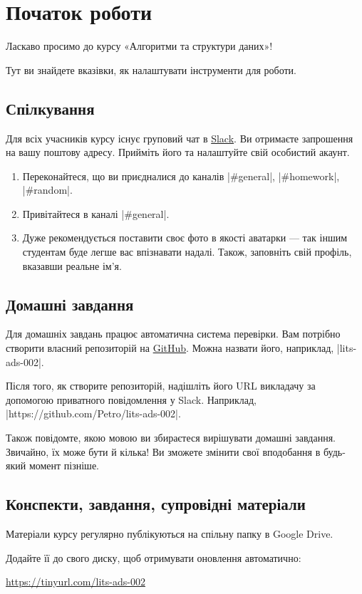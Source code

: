 \documentclass[12pt,a4paper]{article}
\begin{document}
\section*{Початок роботи}

Ласкаво просимо до курсу «Алгоритми та структури даних»!

Тут ви знайдете вказівки, як налаштувати інструменти для роботи.


\subsection*{Спілкування}

Для всіх учасників курсу існує груповий чат в \href{https://slack.com}{\color{blue}Slack}.
Ви отримаєте запрошення на вашу поштову адресу.
Прийміть його та налаштуйте свій особистий акаунт.

\begin{enumerate}
    \item Переконайтеся, що ви приєдналися до каналів |#general|, |#homework|, |#random|.
    \item Привітайтеся в каналі |#general|.
    \item Дуже рекомендується поставити своє фото в якості аватарки --- так іншим студентам буде легше вас впізнавати надалі. Також, заповніть свій профіль, вказавши реальне ім’я.
\end{enumerate}


\subsection*{Домашні завдання}

Для домашніх завдань працює автоматична система перевірки.
Вам потрібно створити власний репозиторій на \href{https://github.com}{\color{blue}GitHub}.
Можна назвати його, наприклад, |lits-ads-002|.

Після того, як створите репозиторій, надішліть його URL викладачу за допомогою приватного повідомлення у Slack.
Наприклад, |https://github.com/Petro/lits-ads-002|.

Також повідомте, якою мовою ви збираєтеся вирішувати домашні завдання.
Звичайно, їх може бути й кілька!
Ви зможете змінити свої вподобання в будь-який момент пізніше.


\subsection*{Конспекти, завдання, супровідні матеріали}

Матеріали курсу регулярно публікуються на спільну папку в Google Drive.

Додайте її до свого диску, щоб отримувати оновлення автоматично:

\href{https://tinyurl.com/lits-ads-002}{\color{blue}https://tinyurl.com/lits-ads-002}
\end{document}
